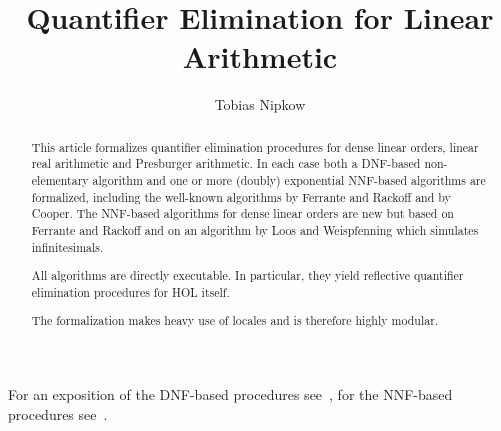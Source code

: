 \documentclass[11pt,a4paper]{article}
\begin{document}
\title{Quantifier Elimination for Linear Arithmetic}
\author{Tobias Nipkow}
\maketitle

\begin{abstract}
This article formalizes quantifier elimination procedures for dense
linear orders, linear real arithmetic and Presburger arithmetic.  In
each case both a DNF-based non-elementary algorithm and one or more
(doubly) exponential NNF-based algorithms are formalized, including
the well-known algorithms by Ferrante and Rackoff and by Cooper. The
NNF-based algorithms for dense linear orders are new but based on
Ferrante and Rackoff and on an algorithm by Loos and Weispfenning
which simulates infinitesimals.

All algorithms are directly executable. In particular, they yield
reflective quantifier elimination procedures for HOL itself.

The formalization makes heavy use of locales and is therefore highly modular.
\end{abstract}

\noindent
For an exposition of the DNF-based procedures see~\cite{Nipkow-MOD2007},
for the NNF-based procedures see~\cite{Nipkow-IJCAR08}.
\tableofcontents





\end{document}
